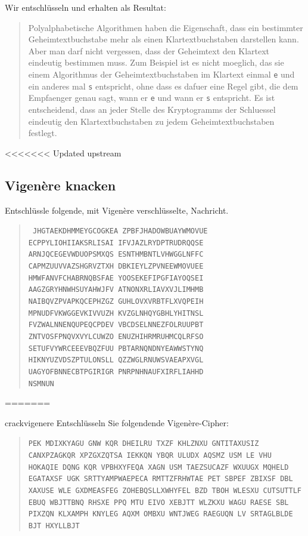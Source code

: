 \documentclass[%
<<<<<<< Updated upstream
11pt,%
twoside,%
titlepage,%
german,%
headsepline%
]{scrartcl}
\begin{document}
Wir entschlüsseln und erhalten als Resultat:
\begin{quote}
Polyalphabetische Algorithmen haben die Eigenschaft, dass ein bestimmter Geheimtextbuchstabe mehr als einen Klartextbuchstaben darstellen kann. Aber man darf nicht vergessen, dass der Geheimtext den Klartext eindeutig bestimmen muss. Zum Beispiel ist es nicht moeglich, das sie einem Algorithmus der Geheimtextbuchstaben im Klartext einmal \texttt{e} und ein anderes mal \texttt{s} entspricht, ohne dass es dafuer eine Regel gibt, die dem Empfaenger genau sagt, wann er \texttt{e} und wann er \texttt{s} entspricht. Es ist entscheidend, dass an jeder Stelle des Kryptogramms der Schluessel eindeutig den Klartextbuchstaben	zu jedem Geheimtextbuchstaben festlegt.
\end{quote}

<<<<<<< Updated upstream
\subsection{Vigen\`ere knacken}

Entschlüssle folgende, mit Vigen\`ere verschlüsselte, Nachricht.

\begin{quote}
\texttt{\Large
JHGTAEKDHMMEYGCOGKEA ZPBFJHADOWBUAYWMOVUE\\
ECPPYLIOHIIAKSRLISAI IFVJAZLRYDPTRUDRQQSE\\
ARNJQCEGEVWDUOPSMXQS ESNTHMBNTLVHWGGLNFFC\\
CAPMZUUVVAZSHGRVZTXH DBKIEYLZPVNEEWMOVUEE\\
HMWFANVFCHABRNQBSFAE YOOSEKEFIPGFIAYOQSEI\\
AAGZGRYHNWHSUYAHWJFV ATNONXRLIAVXVJLIMHMB\\
NAIBQVZPVAPKQCEPHZGZ GUHLOVXVRBTFLXVQPEIH\\
MPNUDFVKWGGEVKIVVUZH KVZGLNHQYGBHLYHITNSL\\
FVZWALNNENQUPEQCPDEV VBCDSELNNEZFOLRUUPBT\\
ZNTVOSFPNQVXVYLCUWZO ENUZHIHRMRUHMCQLRFSO\\
SETUFVYWRCEEEVBQZFUU PBTARNQNDNYEAWWSTYNQ\\
HIKNYUZVDSZPTULONSLL QZZWGLRNUWSVAEAPXVGL\\
UAGYOFBNNECBTPGIRIGR PNRPNHNAUFXIRFLIAHHD\\
NSMNUN
}
\end{quote}
=======
\begin{uebenv}{crackvigenere}
    Entschlüsseln Sie folgendende Vigen\`ere-Cipher:

    \begin{quote}
        \texttt{PEK MDIXKYAGU GNW KQR DHEILRU TXZF KHLZNXU GNTITAXUSIZ CANXPZAGKQR XPZGXZQTSA IEKKQN YBQR ULUDX AQSMZ USM LE VHU HOKAQIE DQNG KQR VPBHXYFEQA XAGN USM TAEZSUCAZF WXUUGX MQHELD EGATAXSF UGK SRTTYAMPWAEPECA RMTTZFRHWTAE PET SBPEF ZBIXSF DBL XAXUSE WLE GXDMEASFEG ZOHEBQSLLXWHYFEL BZD TBOH WLESXU CUTSUTTLF EBUQ WBJTTBNQ RHSXE PPQ MTU EIVO XEBJTT WLZKXU WAGU RAESE SBL PIXZQN KLXAMPH KNYLEG AQXM OMBXU WNTJWEG RAEGUQN LV SRTAGLBLDE BJT HXYLLBJT}
    \end{quote}
\end{uebenv}
\end{document}
